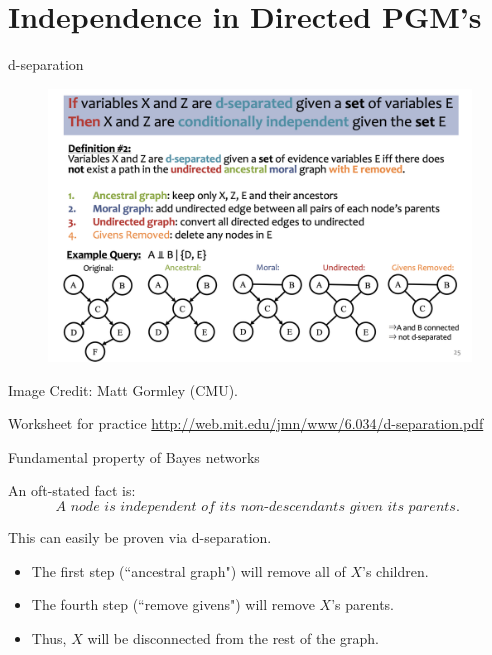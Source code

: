 \documentclass[10pt]{beamer}
\begin{document}
%  
%    

 
\section{Independence in Directed PGM's}


\begin{frame}{d-separation}

\begin{figure}[H]
\includegraphics[width=\textwidth]{images/d-separation}
\end{figure} 
\vfill
\tiny \hfill Image Credit: Matt Gormley (CMU). 
 \end{frame}
 
 
\begin{frame}{Worksheet for practice}
\url{http://web.mit.edu/jmn/www/6.034/d-separation.pdf}
\end{frame}

\begin{frame}{Fundamental property of Bayes networks}

An oft-stated fact is:
\[ \textit{A node is independent of its non-descendants given its parents. } \]

This can easily be proven via d-separation.  
\begin{itemize}
\item The first step (``ancestral graph") will remove all of $X$'s children.
\item The fourth step (``remove givens") will remove $X$'s parents. 
\item Thus, $X$ will be disconnected from the rest of the graph.
\end{itemize}
\end{frame}
\end{document}
